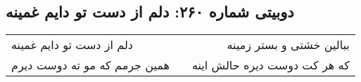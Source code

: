 \begin{center}
\section*{دوبیتی شماره ۲۶۰: دلم از دست تو دایم غمینه}
\label{sec:260}
\begin{longtable}{l p{0.5cm} r}
دلم از دست تو دایم غمینه
&&
ببالین خشتی و بستر زمینه
\\
همین جرمم که مو ته دوست دیرم
&&
که هر کت دوست دیره حالش اینه
\\
\end{longtable}
\end{center}
